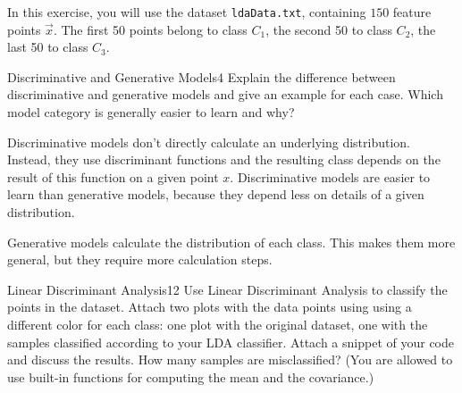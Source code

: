 \newif\ifvimbug
\vimbugfalse

\ifvimbug

\fi


In this exercise, you will use the dataset \texttt{ldaData.txt}, containing $150$ feature points $\vec x$. The first 50 points belong to class $C_1$, the second 50 to class $C_2$, the last 50 to class $C_3$.


\begin{questions}

\begin{question}{Discriminative and Generative Models}{4}
Explain the difference between discriminative and generative models and give an example for each case.
Which model category is generally easier to learn and why?
 
\begin{answer}
Discriminative models don't directly calculate an underlying distribution. Instead, they use discriminant functions and the resulting class depends on the result of this function on a given point $x$. Discriminative models are easier to learn than generative models, because they depend less on details of a given distribution.

Generative models calculate the distribution of each class. This makes them more general, but they require more calculation steps.
	
\end{answer}

\end{question}


\begin{question}{Linear Discriminant Analysis}{12}
Use Linear Discriminant Analysis to classify the points in the dataset. Attach two plots with the data points using using a different color for each class: one plot with the original dataset, one with the samples classified according to your LDA classifier. Attach a snippet of your code and discuss the results. How many samples are misclassified? (You are allowed to use built-in functions for computing the mean and the covariance.)

\begin{answer}\end{answer}
\end{question}


\end{questions}
